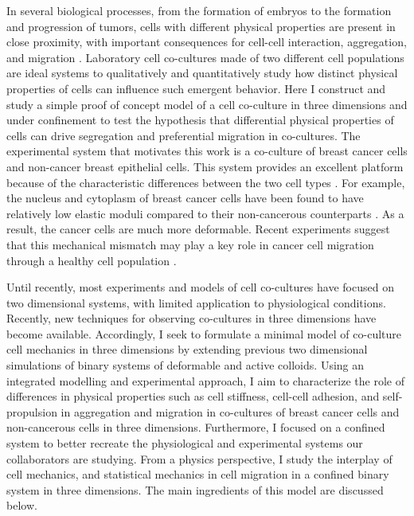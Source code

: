 \documentclass[aps,prb,twocolumn,groupedaddress,nofootinbib,floatfix]{revtex4}
\begin{document}
In several biological processes, from the formation of embryos to the formation and progression of tumors, cells with different physical properties are present in close proximity, with important consequences for cell-cell interaction, aggregation, and migration \cite{Lee, Suresh}.
Laboratory cell co-cultures made of two different cell populations are ideal systems to qualitatively and quantitatively study how distinct physical properties of cells can influence such emergent behavior. Here I construct and study a simple proof of concept model of a cell co-culture in three dimensions 
and under confinement to test the hypothesis that differential physical properties of cells can drive segregation and preferential migration in co-cultures.   
The experimental system that motivates this work is a co-culture of breast cancer cells and non-cancer breast epithelial cells. 
This system provides an excellent platform because of the characteristic differences between the two cell types \cite{Lee,Mingming}. 
For example, the nucleus and cytoplasm of breast cancer cells have been found to have relatively low elastic moduli compared to their non-cancerous counterparts \cite{Lee}. 
As a result, the cancer cells are much more deformable. Recent experiments suggest that this mechanical mismatch may play a key role in cancer cell migration through a healthy
cell population \cite{Lee}. 

Until recently, most experiments and models of cell co-cultures have focused on two dimensional systems, with limited application to physiological conditions\cite{Jong}.
Recently, new techniques for observing co-cultures in three dimensions have become available\cite{Alessandri}.
Accordingly, I seek to formulate a minimal model of co-culture cell mechanics in three dimensions by extending previous two dimensional simulations of binary systems of deformable and active colloids\cite{Butcher}.
Using an integrated modelling and experimental approach, I aim to characterize the role of differences in physical properties such as cell stiffness, cell-cell adhesion, and self-propulsion in  aggregation and migration in co-cultures of breast cancer cells and non-cancerous cells in three dimensions.
Furthermore, I focused on a confined system to better recreate the physiological and experimental systems our collaborators are studying.
From a physics perspective, I study the interplay of cell mechanics, and statistical mechanics in cell migration in a confined binary system in three dimensions.
The main ingredients of this model are discussed below.\\
\end{document}
